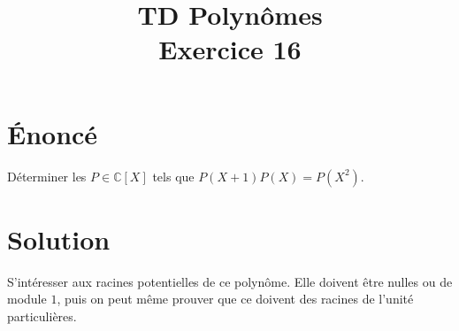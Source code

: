 \documentclass[french]{article}
\title{TD Polynômes \\ Exercice 16}
\date{}
\newcommand{\C}{\mathbb{C}}
\begin{document}
\maketitle

\section{Énoncé}
Déterminer les $P\in\C[X]$ tels que $P(X+1)P(X)=P(X^2)$.
\section{Solution}
S'intéresser aux racines potentielles de ce polynôme. Elle doivent être nulles ou de module $1$, puis on peut même prouver que ce doivent des racines de l'unité particulières.
\end{document}
